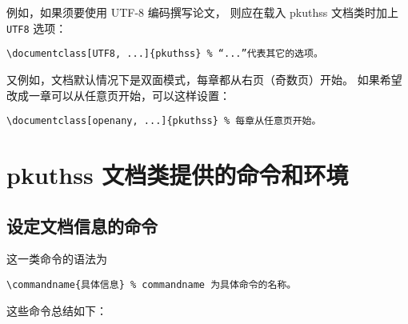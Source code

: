 例如，如果须要使用 UTF-8 编码撰写论文，
则应在载入 pkuthss 文档类时加上 \verb|UTF8| 选项：
\begin{Verbatim}
\documentclass[UTF8, ...]{pkuthss} % “...”代表其它的选项。
\end{Verbatim}

又例如，文档默认情况下是双面模式，每章都从右页（奇数页）开始。
如果希望改成一章可以从任意页开始，可以这样设置：
\begin{Verbatim}
\documentclass[openany, ...]{pkuthss} % 每章从任意页开始。
\end{Verbatim}

\section{pkuthss 文档类提供的命令和环境}
\subsection{设定文档信息的命令}

这一类命令的语法为
\begin{Verbatim}
\commandname{具体信息} % commandname 为具体命令的名称。
\end{Verbatim}

这些命令总结如下：

